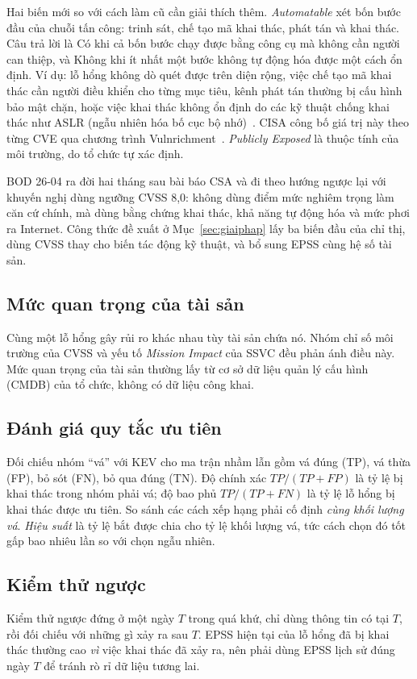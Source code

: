 \documentclass[conference]{IEEEtran}
\begin{document}
Hai biến mới so với cách làm cũ cần giải thích thêm. \emph{Automatable} xét bốn bước đầu của chuỗi tấn công:
trinh sát, chế tạo mã khai thác, phát tán và khai thác. Câu trả lời là Có khi cả bốn bước chạy được bằng công cụ
mà không cần người can thiệp, và Không khi ít nhất một bước không tự động hóa được một cách ổn định. Ví dụ: lỗ hổng không dò quét được trên diện rộng, việc chế tạo mã khai thác cần người điều khiển cho từng mục tiêu, kênh phát tán thường bị cấu hình bảo mật chặn, hoặc việc khai thác không ổn định do các kỹ thuật chống khai thác như ASLR (ngẫu nhiên hóa bố cục bộ nhớ)~\cite{ssvcauto}. CISA công bố giá trị này theo từng CVE qua chương trình
Vulnrichment~\cite{vulnrichment}. \emph{Publicly Exposed} là thuộc tính của môi trường, do tổ chức tự xác định.

BOD 26-04 ra đời hai tháng sau bài báo CSA và đi theo hướng ngược lại với khuyến nghị dùng ngưỡng CVSS 8,0:
không dùng điểm mức nghiêm trọng làm căn cứ chính, mà dùng bằng chứng khai thác, khả năng tự động hóa và mức
phơi ra Internet. Công thức đề xuất ở Mục~\ref{sec:giaiphap} lấy ba biến đầu của chỉ thị, dùng CVSS thay cho
biến tác động kỹ thuật, và bổ sung EPSS cùng hệ số tài sản.

\subsection{Mức quan trọng của tài sản}
Cùng một lỗ hổng gây rủi ro khác nhau tùy tài sản chứa nó. Nhóm chỉ số môi trường của CVSS và yếu
tố \emph{Mission Impact} của SSVC đều phản ánh điều này. Mức quan trọng của tài sản thường lấy từ
cơ sở dữ liệu quản lý cấu hình (CMDB) của tổ chức, không có dữ liệu công khai.

\subsection{Đánh giá quy tắc ưu tiên}
Đối chiếu nhóm ``vá'' với KEV cho ma trận nhầm lẫn gồm vá đúng (TP), vá thừa (FP), bỏ sót (FN),
bỏ qua đúng (TN). Độ chính xác $TP/(TP+FP)$ là tỷ lệ bị khai thác trong nhóm phải vá; độ bao phủ
$TP/(TP+FN)$ là tỷ lệ lỗ hổng bị khai thác được ưu tiên. So sánh các cách xếp hạng phải cố định
\emph{cùng khối lượng vá}. \emph{Hiệu suất} là tỷ lệ bắt được chia cho tỷ lệ khối lượng vá, tức cách chọn đó tốt gấp bao nhiêu lần so với chọn ngẫu nhiên.

\subsection{Kiểm thử ngược}
Kiểm thử ngược đứng ở một ngày $T$ trong quá khứ, chỉ dùng thông tin có tại $T$, rồi đối chiếu
với những gì xảy ra sau $T$. EPSS hiện tại của lỗ hổng đã bị khai thác thường cao \emph{vì} việc
khai thác đã xảy ra, nên phải dùng EPSS lịch sử đúng ngày $T$ để tránh rò rỉ dữ liệu tương lai.
\end{document}
